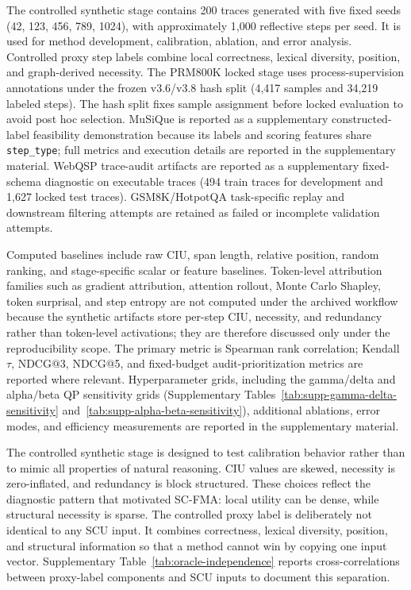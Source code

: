 \documentclass[a4paper,fleqn]{cas-sc}
\begin{document}
The controlled synthetic stage contains 200 traces generated with five fixed seeds (42, 123, 456, 789, 1024), with approximately 1,000 reflective steps per seed. It is used for method development, calibration, ablation, and error analysis. Controlled proxy step labels combine local correctness, lexical diversity, position, and graph-derived necessity. The PRM800K locked stage uses process-supervision annotations under the frozen v3.6/v3.8 hash split (4,417 samples and 34,219 labeled steps). The hash split fixes sample assignment before locked evaluation to avoid post hoc selection. MuSiQue is reported as a supplementary constructed-label feasibility demonstration because its labels and scoring features share \texttt{step\_type}; full metrics and execution details are reported in the supplementary material. WebQSP trace-audit artifacts are reported as a supplementary fixed-schema diagnostic on executable traces (494 train traces for development and 1,627 locked test traces). GSM8K/HotpotQA task-specific replay and downstream filtering attempts are retained as failed or incomplete validation attempts.

Computed baselines include raw CIU, span length, relative position, random ranking, and stage-specific scalar or feature baselines. Token-level attribution families such as gradient attribution, attention rollout, Monte Carlo Shapley, token surprisal, and step entropy are not computed under the archived workflow because the synthetic artifacts store per-step CIU, necessity, and redundancy rather than token-level activations; they are therefore discussed only under the reproducibility scope. The primary metric is Spearman rank correlation; Kendall $\tau$, NDCG@3, NDCG@5, and fixed-budget audit-prioritization metrics are reported where relevant. Hyperparameter grids, including the gamma/delta and alpha/beta QP sensitivity grids (Supplementary Tables~\ref{tab:supp-gamma-delta-sensitivity} and~\ref{tab:supp-alpha-beta-sensitivity}), additional ablations, error modes, and efficiency measurements are reported in the supplementary material.

The controlled synthetic stage is designed to test calibration behavior rather than to mimic all properties of natural reasoning. CIU values are skewed, necessity is zero-inflated, and redundancy is block structured. These choices reflect the diagnostic pattern that motivated SC-FMA: local utility can be dense, while structural necessity is sparse. The controlled proxy label is deliberately not identical to any SCU input. It combines correctness, lexical diversity, position, and structural information so that a method cannot win by copying one input vector. Supplementary Table~\ref{tab:oracle-independence} reports cross-correlations between proxy-label components and SCU inputs to document this separation.
\end{document}
